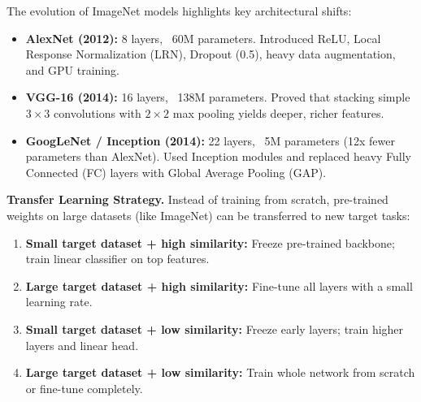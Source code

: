 \documentclass[a4paper,11pt]{article}
\newcommand{\vocab}[1]{\textbf{\color{navy}#1}}
\begin{document}
The evolution of ImageNet models highlights key architectural shifts:
\begin{itemize}
  \item \vocab{AlexNet (2012):} 8 layers, ~60M parameters. Introduced ReLU, Local Response Normalization (LRN), Dropout (0.5), heavy data augmentation, and GPU training.
  \item \vocab{VGG-16 (2014):} 16 layers, ~138M parameters. Proved that stacking simple $3 \times 3$ convolutions with $2 \times 2$ max pooling yields deeper, richer features.
  \item \vocab{GoogLeNet / Inception (2014):} 22 layers, ~5M parameters (12x fewer parameters than AlexNet). Used Inception modules and replaced heavy Fully Connected (FC) layers with Global Average Pooling (GAP).
\end{itemize}

\begin{table}[htbp]
  \centering
  \caption{Comparison of Classic Vision Architectures}
\end{table}

\noindent\textbf{Transfer Learning Strategy.}
Instead of training from scratch, pre-trained weights on large datasets (like ImageNet) can be transferred to new target tasks:
\begin{enumerate}[leftmargin=1.5em]
  \item \textbf{Small target dataset + high similarity:} Freeze pre-trained backbone; train linear classifier on top features.
  \item \textbf{Large target dataset + high similarity:} Fine-tune all layers with a small learning rate.
  \item \textbf{Small target dataset + low similarity:} Freeze early layers; train higher layers and linear head.
  \item \textbf{Large target dataset + low similarity:} Train whole network from scratch or fine-tune completely.
\end{enumerate}
\end{document}
